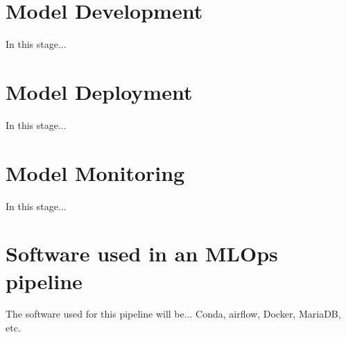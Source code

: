 \documentclass[12pt]{report}
\begin{document}
\section{Model Development}
In this stage...

\section{Model Deployment}
In this stage...

\section{Model Monitoring}
In this stage...

\section{Software used in an MLOps pipeline}\label{sec:Software}
The software used for this pipeline will be... 
Conda, airflow, Docker, MariaDB, etc.

\printbibliography
\end{document}
